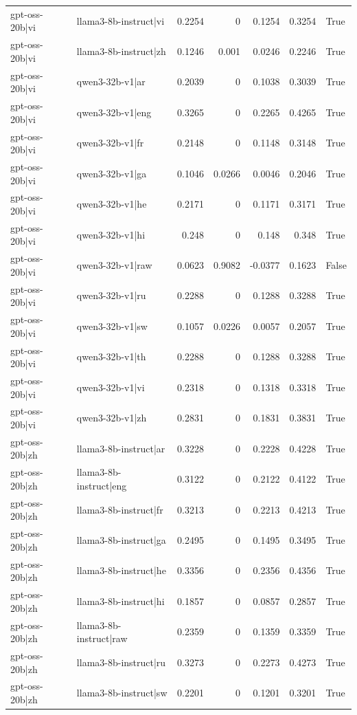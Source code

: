 \begin{table}
\begin{tabular}{l l r r r r l}
gpt-oss-20b|vi & llama3-8b-instruct|vi & 0.2254 & 0 & 0.1254 & 0.3254 & True \\
gpt-oss-20b|vi & llama3-8b-instruct|zh & 0.1246 & 0.001 & 0.0246 & 0.2246 & True \\
gpt-oss-20b|vi & qwen3-32b-v1|ar & 0.2039 & 0 & 0.1038 & 0.3039 & True \\
gpt-oss-20b|vi & qwen3-32b-v1|eng & 0.3265 & 0 & 0.2265 & 0.4265 & True \\
gpt-oss-20b|vi & qwen3-32b-v1|fr & 0.2148 & 0 & 0.1148 & 0.3148 & True \\
gpt-oss-20b|vi & qwen3-32b-v1|ga & 0.1046 & 0.0266 & 0.0046 & 0.2046 & True \\
gpt-oss-20b|vi & qwen3-32b-v1|he & 0.2171 & 0 & 0.1171 & 0.3171 & True \\
gpt-oss-20b|vi & qwen3-32b-v1|hi & 0.248 & 0 & 0.148 & 0.348 & True \\
gpt-oss-20b|vi & qwen3-32b-v1|raw & 0.0623 & 0.9082 & -0.0377 & 0.1623 & False \\
gpt-oss-20b|vi & qwen3-32b-v1|ru & 0.2288 & 0 & 0.1288 & 0.3288 & True \\
gpt-oss-20b|vi & qwen3-32b-v1|sw & 0.1057 & 0.0226 & 0.0057 & 0.2057 & True \\
gpt-oss-20b|vi & qwen3-32b-v1|th & 0.2288 & 0 & 0.1288 & 0.3288 & True \\
gpt-oss-20b|vi & qwen3-32b-v1|vi & 0.2318 & 0 & 0.1318 & 0.3318 & True \\
gpt-oss-20b|vi & qwen3-32b-v1|zh & 0.2831 & 0 & 0.1831 & 0.3831 & True \\
gpt-oss-20b|zh & llama3-8b-instruct|ar & 0.3228 & 0 & 0.2228 & 0.4228 & True \\
gpt-oss-20b|zh & llama3-8b-instruct|eng & 0.3122 & 0 & 0.2122 & 0.4122 & True \\
gpt-oss-20b|zh & llama3-8b-instruct|fr & 0.3213 & 0 & 0.2213 & 0.4213 & True \\
gpt-oss-20b|zh & llama3-8b-instruct|ga & 0.2495 & 0 & 0.1495 & 0.3495 & True \\
gpt-oss-20b|zh & llama3-8b-instruct|he & 0.3356 & 0 & 0.2356 & 0.4356 & True \\
gpt-oss-20b|zh & llama3-8b-instruct|hi & 0.1857 & 0 & 0.0857 & 0.2857 & True \\
gpt-oss-20b|zh & llama3-8b-instruct|raw & 0.2359 & 0 & 0.1359 & 0.3359 & True \\
gpt-oss-20b|zh & llama3-8b-instruct|ru & 0.3273 & 0 & 0.2273 & 0.4273 & True \\
gpt-oss-20b|zh & llama3-8b-instruct|sw & 0.2201 & 0 & 0.1201 & 0.3201 & True \\

\end{tabular}
\end{table}
